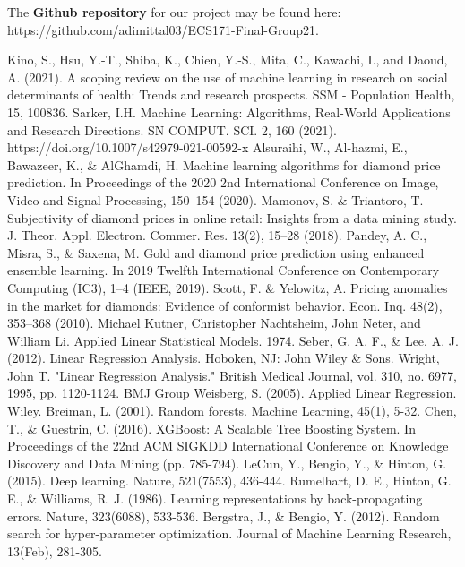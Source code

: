 \documentclass[conference]{IEEEtran}
\begin{document}
The \textbf{Github repository} for our project may be found here: https://github.com/adimittal03/ECS171-Final-Group21. 



\newpage
\begin{thebibliography}{00}
 Kino, S., Hsu, Y.-T., Shiba, K., Chien, Y.-S., Mita, C., Kawachi, I., and Daoud, A. (2021). A scoping review on the use of machine learning in research on social determinants of health: Trends and research prospects. SSM - Population Health, 15, 100836.
 Sarker, I.H. Machine Learning: Algorithms, Real-World Applications and Research Directions. SN COMPUT. SCI. 2, 160 (2021). https://doi.org/10.1007/s42979-021-00592-x
 Alsuraihi, W., Al-hazmi, E., Bawazeer, K., \& AlGhamdi, H. Machine learning algorithms for diamond price prediction. In Proceedings of the 2020 2nd International Conference on Image, Video and Signal Processing, 150–154 (2020).
 Mamonov, S. \& Triantoro, T. Subjectivity of diamond prices in online retail: Insights from a data mining study. J. Theor. Appl. Electron. Commer. Res. 13(2), 15–28 (2018).
 Pandey, A. C., Misra, S., \& Saxena, M. Gold and diamond price prediction using enhanced ensemble learning. In 2019 Twelfth International Conference on Contemporary Computing (IC3), 1–4 (IEEE, 2019).
 Scott, F. \& Yelowitz, A. Pricing anomalies in the market for diamonds: Evidence of conformist behavior. Econ. Inq. 48(2), 353–368 (2010).
Michael Kutner, Christopher Nachtsheim, John Neter, and William Li. Applied Linear Statistical Models. 1974.
Seber, G. A. F., \& Lee, A. J. (2012). Linear Regression Analysis. Hoboken, NJ: John Wiley \& Sons.
 Wright, John T. "Linear Regression Analysis." British Medical Journal, vol. 310, no. 6977, 1995, pp. 1120-1124. BMJ Group
 Weisberg, S. (2005). Applied Linear Regression. Wiley.
 Breiman, L. (2001). Random forests. Machine Learning, 45(1), 5-32.
 Chen, T., \& Guestrin, C. (2016). XGBoost: A Scalable Tree Boosting System. In Proceedings of the 22nd ACM SIGKDD International Conference on Knowledge Discovery and Data Mining (pp. 785-794).
 LeCun, Y., Bengio, Y., \& Hinton, G. (2015). Deep learning. Nature, 521(7553), 436-444.
 Rumelhart, D. E., Hinton, G. E., \& Williams, R. J. (1986). Learning representations by back-propagating errors. Nature, 323(6088), 533-536.
 Bergstra, J., \& Bengio, Y. (2012). Random search for hyper-parameter optimization. Journal of Machine Learning Research, 13(Feb), 281-305.

\end{thebibliography}
\end{document}
